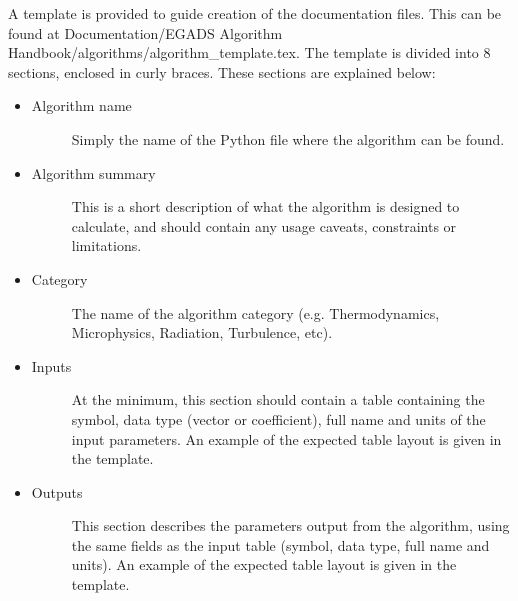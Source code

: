 \documentclass[a4paper,10pt,openany,english]{sphinxmanual}
\begin{document}
A template is provided to guide creation of the documentation files. This can be found at Documentation/EGADS Algorithm Handbook/algorithms/algorithm\_template.tex. The template is divided into 8 sections, enclosed in curly braces. These sections are explained below:
\begin{itemize}
\item {} \begin{description}
\item[{Algorithm name}] \leavevmode
Simply the name of the Python file where the algorithm can be found.

\end{description}

\item {} \begin{description}
\item[{Algorithm summary}] \leavevmode
This is a short description of what the algorithm is designed to calculate, and should contain any usage caveats, constraints or limitations.

\end{description}

\item {} \begin{description}
\item[{Category}] \leavevmode
The name of the algorithm category (e.g. Thermodynamics, Microphysics, Radiation, Turbulence, etc).

\end{description}

\item {} \begin{description}
\item[{Inputs}] \leavevmode
At the minimum, this section should contain a table containing the symbol, data type (vector or coefficient), full name and units of the input parameters. An example of the expected table layout is given in the template.

\end{description}

\item {} \begin{description}
\item[{Outputs}] \leavevmode
This section describes the parameters output from the algorithm, using the same fields as the input table (symbol, data type, full name and units). An example of the expected table layout is given in the template.

\end{description}


\end{itemize}
\end{document}
